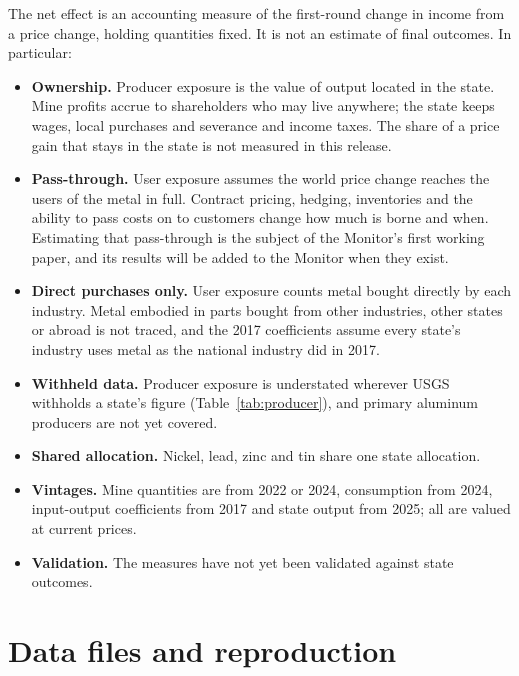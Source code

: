 \documentclass[11pt]{article}
\begin{document}
The net effect is an accounting measure of the first-round change in income from a price
change, holding quantities fixed. It is not an estimate of final outcomes. In particular:
\begin{itemize}
  \item \textbf{Ownership.} Producer exposure is the value of output located in the state.
    Mine profits accrue to shareholders who may live anywhere; the state keeps wages,
    local purchases and severance and income taxes. The share of a price gain that stays in
    the state is not measured in this release.
  \item \textbf{Pass-through.} User exposure assumes the world price change reaches the
    users of the metal in full. Contract pricing, hedging, inventories and the ability to
    pass costs on to customers change how much is borne and when. Estimating that
    pass-through is the subject of the Monitor's first working paper, and its results will
    be added to the Monitor when they exist.
  \item \textbf{Direct purchases only.} User exposure counts metal bought directly by each
    industry. Metal embodied in parts bought from other industries, other states or abroad
    is not traced, and the 2017 coefficients assume every state's industry uses metal as
    the national industry did in 2017.
  \item \textbf{Withheld data.} Producer exposure is understated wherever USGS withholds a
    state's figure (Table~\ref{tab:producer}), and primary aluminum producers are not yet
    covered.
  \item \textbf{Shared allocation.} Nickel, lead, zinc and tin share one state allocation.
  \item \textbf{Vintages.} Mine quantities are from 2022 or 2024, consumption from 2024,
    input-output coefficients from 2017 and state output from 2025; all are valued at
    current prices.
  \item \textbf{Validation.} The measures have not yet been validated against state
    outcomes.
\end{itemize}

\section{Data files and reproduction}
\end{document}
